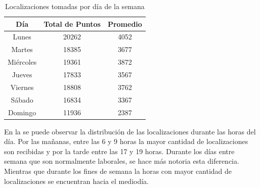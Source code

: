 \begin{table}[h]
	\centering
	\begin{tabular}{ccc}
        \toprule
    	Día  & Total de Puntos & Promedio\\
    	\midrule
    	Lunes & 20262 & 4052 \\
    	Martes & 18385 & 3677 \\
    	Miércoles & 19361  & 3872 \\ 
    	Jueves & 17833 & 3567 \\
    	Viernes & 18808 & 3762 \\
    	Sábado & 16834 & 3367 \\
    	Domingo & 11936 & 2387 \\
    	\bottomrule
	\end{tabular}
	\caption{Localizaciones tomadas por día de la semana} 
	\label{table:localizaciones_por_dia}
\end{table}

En la  se puede observar la distribución de las localizaciones durante las horas del día. Por las mañanas, entre las 6 y 9 horas la mayor cantidad de localizaciones son recibidas y por la tarde entre las 17 y 19 horas. Durante los días entre semana que son normalmente laborales, se hace más notoria esta diferencia. Mientras que durante los fines de semana la horas con mayor cantidad de localizaciones se encuentran hacia el mediodía.

